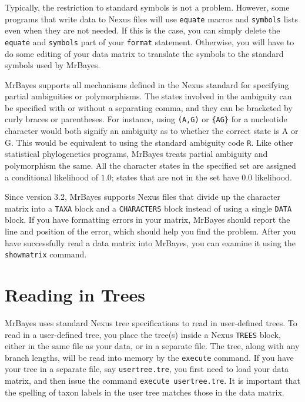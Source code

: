 \documentclass[12pt]{book}
\begin{document}
Typically, the restriction to standard symbols is not a problem. However, some programs that write
data to Nexus files will use \texttt{equate} macros and \texttt{symbols} lists even when they are
not needed. If this is the case, you can simply delete the \texttt{equate} and \texttt{symbols}
part of your \texttt{format} statement. Otherwise, you will have to do some editing of your data
matrix to translate the symbols to the standard symbols used by MrBayes.

MrBayes supports all mechanisms defined in the Nexus standard for specifying partial ambiguities or
polymorphisms. The states involved in the ambiguity can be specified with or without a separating
comma, and they can be bracketed by curly braces or parentheses. For instance, using \texttt{(A,G)}
or \texttt{\{AG\}} for a nucleotide character would both signify an ambiguity as to whether the
correct state is A or G. This would be equivalent to using the standard ambiguity code \texttt{R}.
Like other statistical phylogenetics programs, MrBayes treats partial ambiguity and polymorphism
the same. All the character states in the specified set are assigned a conditional likelihood of
$1.0$; states that are not in the set have $0.0$ likelihood.

Since version 3.2, MrBayes supports Nexus files that divide up the character matrix into a
\texttt{TAXA} block and a \texttt{CHARACTERS} block instead of using a single \texttt{DATA} block.
If you have formatting errors in your matrix, MrBayes should report the line and position of the
error, which should help you find the problem. After you have successfully read a data matrix into
MrBayes, you can examine it using the \texttt{showmatrix} command.

\section{Reading in Trees}

MrBayes uses standard Nexus tree specifications to read in user-defined trees. To read in a
user-defined tree, you place the tree(s) inside a Nexus \texttt{TREES} block, either in the same
file as your data, or in a separate file. The tree, along with any branch lengths, will be read
into memory by the \texttt{execute} command. If you have your tree in a separate file, say
\texttt{usertree.tre}, you first need to load your data matrix, and then issue the command
\texttt{execute usertree.tre}. It is important that the spelling of taxon labels in the user tree
matches those in the data matrix. 
\end{document}
